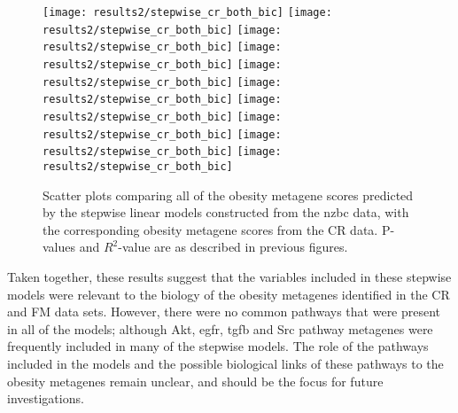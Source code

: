 \begin{figure}[htpb]
	\centering
	\texttt{[image: results2/stepwise\_cr\_both\_bic]}
	\texttt{[image: results2/stepwise\_cr\_both\_bic]}
	\texttt{[image: results2/stepwise\_cr\_both\_bic]}
	\texttt{[image: results2/stepwise\_cr\_both\_bic]}
	\texttt{[image: results2/stepwise\_cr\_both\_bic]}
	\texttt{[image: results2/stepwise\_cr\_both\_bic]}
	\texttt{[image: results2/stepwise\_cr\_both\_bic]}
	\texttt{[image: results2/stepwise\_cr\_both\_bic]}
	\texttt{[image: results2/stepwise\_cr\_both\_bic]}
	\texttt{[image: results2/stepwise\_cr\_both\_bic]}
	\caption[Comparison of all the obesity metagene scores predicted from the stepwise linear models with the original obesity metagene scores from the CR data]{Scatter plots comparing all of the obesity metagene scores predicted by the stepwise linear models constructed from the \gls{nzbc} data, with the corresponding obesity metagene scores from the CR data.
	P-values and $R^2$-value are as described in previous figures.}
	\label{fig:stepwise_cr}
\end{figure}

Taken together, these results suggest that the variables included in these stepwise models were relevant to the biology of the obesity metagenes identified in the CR and FM data sets.
However, there were no common pathways that were present in all of the models; although Akt, \gls{egfr}, \gls{tgfb} and Src pathway metagenes were frequently included in many of the stepwise models.
The role of the pathways included in the models and the possible biological links of these pathways to the obesity metagenes remain unclear, and should be the focus for future investigations.

